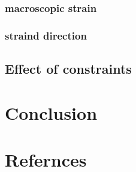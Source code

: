 \documentclass[10pt,a4paper,twocolumn]{article}
\begin{document}
		\subsubsection{macroscopic strain}
		\subsubsection{straind direction}
	
	\subsection{Effect of constraints}

\section{Conclusion}

\section{Refernces}

\begin{thebibliography}
\end{thebibliography}
\end{document}
